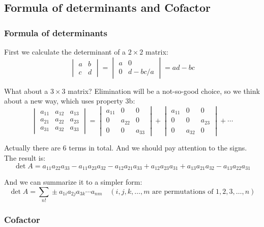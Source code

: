 \documentclass[12pt]{ctexart}
\begin{document}
\subsection{\textbf{Formula of determinants and Cofactor}}
\subsubsection{\textbf{Formula of determinants}}

First we calculate the determinant of a $2 \times 2$ matrix:
\[
  \begin{vmatrix}
    a & b \\
    c & d
  \end{vmatrix} =
  \begin{vmatrix}
    a & 0 \\
    0 & d-bc/a
  \end{vmatrix} =
  ad - bc
\]

What about a $3 \times 3$ matrix? Elimination will be a not-so-good choice, so we
think about a new way, which uses property 3b:
\[
  \begin{vmatrix}
    a_{11} & a_{12} & a_{13} \\
    a_{21} & a_{22} & a_{23} \\
    a_{31} & a_{32} & a_{33}
  \end{vmatrix} =
  \begin{vmatrix}
    a_{11} & 0 & 0 \\
    0 & a_{22} & 0 \\
    0 & 0 & a_{33}
  \end{vmatrix} +
  \begin{vmatrix}
    a_{11} & 0 & 0 \\
    0 & 0 & a_{23} \\
    0 & a_{32} & 0
  \end{vmatrix} +
  \cdots
\]

Actually there are 6 terms in total. And we should pay attention to the signs. The
result is:
\[
  \det A = a_{11}a_{22}a_{33}-a_{11}a_{23}a_{32}-
           a_{12}a_{21}a_{33}+a_{12}a_{23}a_{31}+
           a_{13}a_{21}a_{32}-a_{13}a_{22}a_{31}
\]

And we can summarize it to a simpler form:
\[
  \det A = \sum_{n!}\pm a_{1i}a_{2j}a_{3k} \cdots a_{nm}
  \quad (i, j, k, \ldots, m \text{ are permutations of } 1, 2, 3, \ldots, n)
\]

\subsubsection{\textbf{Cofactor}}
\end{document}
